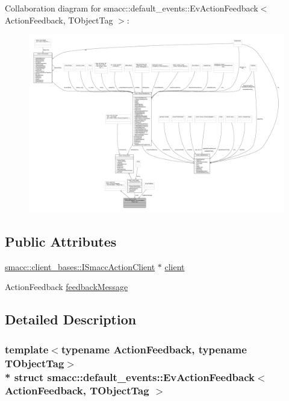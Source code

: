 Collaboration diagram for smacc\+:\+:default\+\_\+events\+:\+:Ev\+Action\+Feedback$<$ Action\+Feedback, T\+Object\+Tag $>$\+:\nopagebreak
\begin{figure}[H]
\begin{center}
\leavevmode
\includegraphics[width=350pt]{structsmacc_1_1default__events_1_1EvActionFeedback__coll__graph}
\end{center}
\end{figure}
\subsection*{Public Attributes}
\begin{DoxyCompactItemize}
\item 
\hyperlink{classsmacc_1_1client__bases_1_1ISmaccActionClient}{smacc\+::client\+\_\+bases\+::\+I\+Smacc\+Action\+Client} $\ast$ \hyperlink{structsmacc_1_1default__events_1_1EvActionFeedback_a356e106d4c54e12dc81a0f3063ecff4a}{client}
\item 
Action\+Feedback \hyperlink{structsmacc_1_1default__events_1_1EvActionFeedback_aa04da2789df313666c6aa9480dc8287d}{feedback\+Message}
\end{DoxyCompactItemize}


\subsection{Detailed Description}
\subsubsection*{template$<$typename Action\+Feedback, typename T\+Object\+Tag$>$\\*
struct smacc\+::default\+\_\+events\+::\+Ev\+Action\+Feedback$<$ Action\+Feedback, T\+Object\+Tag $>$}



